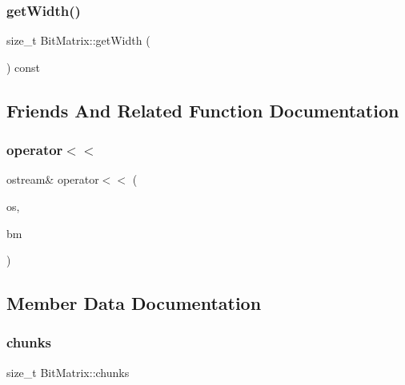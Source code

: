 \subsubsection{\texorpdfstring{get\+Width()}{getWidth()}}
{\footnotesize\ttfamily size\+\_\+t Bit\+Matrix\+::get\+Width (\begin{DoxyParamCaption}{ }\end{DoxyParamCaption}) const\hspace{0.3cm}{\ttfamily [inline]}}



\subsection{Friends And Related Function Documentation}
\mbox{\label{classBitMatrix_aa35d89b587731633f4de5309b083689b}} 
\subsubsection{\texorpdfstring{operator$<$$<$}{operator<<}}
{\footnotesize\ttfamily ostream\& operator$<$$<$ (\begin{DoxyParamCaption}\item[{ostream \&}]{os,  }\item[{const \hyperlink{classBitMatrix}{Bit\+Matrix} \&}]{bm }\end{DoxyParamCaption})\hspace{0.3cm}{\ttfamily [friend]}}



\subsection{Member Data Documentation}
\mbox{\label{classBitMatrix_af4a0d4517ff5a485c5787150f9e6a545}} 
\subsubsection{\texorpdfstring{chunks}{chunks}}
{\footnotesize\ttfamily size\+\_\+t Bit\+Matrix\+::chunks\hspace{0.3cm}{\ttfamily [private]}}

\mbox{\label{classBitMatrix_a546978092da7a641ac9c23daa88a31ae}} 
